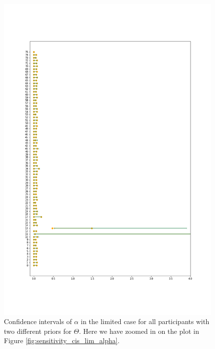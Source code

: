 \begin{figure}
    \centering
    \includegraphics[scale=0.36]{pictures/Sensitivity/ci_lim_alpha_zoom1.png}
    \caption[CIs for $\alpha$ in the limited case, zoomed]{   Confidence intervals of $\alpha$ in the limited case for all participants with two different priors for $\Theta$. Here we have zoomed in on the plot in Figure \ref{fig:sensitivity_cis_lim_alpha}.}
    \label{fig:sensitivity_cis_lim_alpha_zoom1}
\end{figure}

